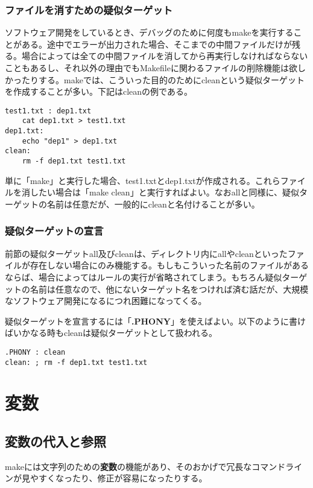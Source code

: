 \documentclass[dvipdfmx, 9pt, a4paper]{jsarticle}
\numberwithin{equation}{section}
\begin{document}
\subsubsection{ファイルを消すための疑似ターゲット}
ソフトウェア開発をしているとき、デバッグのために何度もmakeを実行することがある。途中でエラーが出力された場合、そこまでの中間ファイルだけが残る。場合によっては全ての中間ファイルを消してから再実行しなければならないこともあるし、それ以外の理由でもMakefileに関わるファイルの削除機能は欲しかったりする。makeでは、こういった目的のためにcleanという疑似ターゲットを作成することが多い。下記はcleanの例である。
\begin{lstlisting}[caption=疑似ターゲットclean]
test1.txt : dep1.txt
	cat dep1.txt > test1.txt
dep1.txt:
	echo "dep1" > dep1.txt
clean:
	rm -f dep1.txt test1.txt
\end{lstlisting}\par
単に「make」と実行した場合、test1.txtとdep1.txtが作成される。これらファイルを消したい場合は「make clean」と実行すればよい。なおallと同様に、疑似ターゲットの名前は任意だが、一般的にcleanと名付けることが多い。

\subsubsection{疑似ターゲットの宣言}
前節の疑似ターゲットall及びcleanは、ディレクトリ内にallやcleanといったファイルが存在しない場合にのみ機能する。もしもこういった名前のファイルがあるならば、場合によってはルールの実行が省略されてしまう。もちろん疑似ターゲットの名前は任意なので、他にないターゲット名をつければ済む話だが、大規模なソフトウェア開発になるにつれ困難になってくる。\par
疑似ターゲットを宣言するには「{\bf .PHONY}」を使えばよい。以下のように書けばいかなる時もcleanは疑似ターゲットとして扱われる。
\begin{lstlisting}[caption=.PHONY]
.PHONY : clean
clean: ; rm -f dep1.txt test1.txt
\end{lstlisting}\par

\section{変数}
\subsection{変数の代入と参照}
makeには文字列のための{\bf 変数}の機能があり、そのおかげで冗長なコマンドラインが見やすくなったり、修正が容易になったりする。
\end{document}
